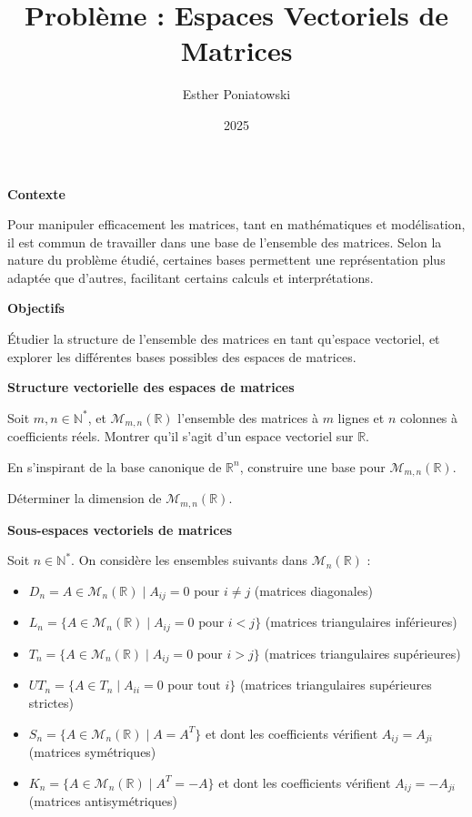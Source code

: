 \documentclass[10pt,a4paper]{article}
\title{Problème : Espaces Vectoriels de Matrices}
\author{Esther Poniatowski}
\date{2025}
\begin{document}
\textbf{Contexte}

Pour manipuler efficacement les matrices, tant en mathématiques et modélisation, il est commun de
travailler dans une base de l'ensemble des matrices. Selon la nature du problème étudié, certaines
bases permettent une représentation plus adaptée que d'autres, facilitant certains calculs et
interprétations.

\bigskip
\textbf{Objectifs}

Étudier la structure de l'ensemble des matrices en tant qu'espace vectoriel, et explorer les
différentes bases possibles des espaces de matrices.

\bigskip
\textbf{Structure vectorielle des espaces de matrices}

\q Soit $m, n \in \mathbb{N}^*$, et $\mathcal{M}_{m,n}(\mathbb{R})$ l'ensemble des matrices à $m$ lignes et
$n$ colonnes à coefficients réels. Montrer qu'il s'agit d'un espace vectoriel sur $\mathbb{R}$.

\q En s'inspirant de la base canonique de $\mathbb{R}^n$, construire une base pour
$\mathcal{M}_{m,n}(\mathbb{R})$.

\q Déterminer la dimension de $\mathcal{M}_{m,n}(\mathbb{R})$.

\bigskip
\textbf{Sous-espaces vectoriels de matrices}

Soit $n \in \mathbb{N}^*$. On considère les ensembles suivants dans $\mathcal{M}_n(\mathbb{R})$ :
\begin{itemize}
    \item $D_n = {A \in \mathcal{M}_n(\mathbb{R}) \mid A_{ij} = 0 \text{ pour } i \neq j}$ (matrices
    diagonales)
    \item $L_n = \{A \in \mathcal{M}_n(\mathbb{R}) \mid A_{ij} = 0 \text{ pour } i < j\}$ (matrices
    triangulaires inférieures)
    \item $T_n = \{A \in \mathcal{M}_n(\mathbb{R}) \mid A_{ij} = 0 \text{ pour } i > j\}$ (matrices
    triangulaires supérieures)
    \item $UT_n = \{A \in T_n \mid A_{ii} = 0 \text{ pour tout } i\}$ (matrices triangulaires
    supérieures strictes)
    \item $S_n = \{A \in \mathcal{M}_n(\mathbb{R}) \mid A = A^T\}$ et dont les coefficients
    vérifient $A_{ij} = A_{ji}$ (matrices symétriques)
    \item $K_n = \{A \in \mathcal{M}_n(\mathbb{R}) \mid A^T = -A\}$ et dont les coefficients
    vérifient $A_{ij} = -A_{ji}$ (matrices antisymétriques)
\end{itemize}
\end{document}
